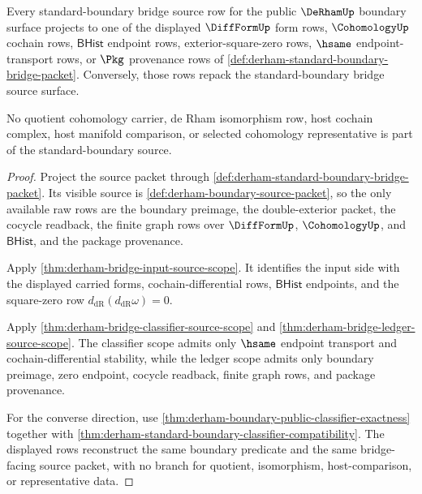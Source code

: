 \begin{theorem}
\label{thm:derham-standard-boundary-source-exhaustion}
Every standard-boundary bridge source row for the public $\DeRhamUp$ boundary
surface projects to one of the displayed $\DiffFormUp$ form rows,
$\CohomologyUp$ cochain rows, $\mathsf{BHist}$ endpoint rows,
exterior-square-zero rows, $\hsame$ endpoint-transport rows, or $\Pkg$
provenance rows of \autoref{def:derham-standard-boundary-bridge-packet}.
Conversely, those rows repack the standard-boundary bridge source surface.

No quotient cohomology carrier, de Rham isomorphism row, host cochain complex,
host manifold comparison, or selected cohomology representative is part of the
standard-boundary source.
\end{theorem}
\begin{proof}
Project the source packet through
\autoref{def:derham-standard-boundary-bridge-packet}. Its visible source is
\autoref{def:derham-boundary-source-packet}, so the only available raw rows are
the boundary preimage, the double-exterior packet, the cocycle readback, the
finite graph rows over $\DiffFormUp$, $\CohomologyUp$, and $\mathsf{BHist}$,
and the package provenance.

Apply \autoref{thm:derham-bridge-input-source-scope}. It identifies the input
side with the displayed carried forms, cochain-differential rows,
$\mathsf{BHist}$ endpoints, and the square-zero row
$d_{\mathrm{dR}}(d_{\mathrm{dR}}\omega)=0$.

Apply \autoref{thm:derham-bridge-classifier-source-scope} and
\autoref{thm:derham-bridge-ledger-source-scope}. The classifier scope admits
only $\hsame$ endpoint transport and cochain-differential stability, while the
ledger scope admits only boundary preimage, zero endpoint, cocycle readback,
finite graph rows, and package provenance.

For the converse direction, use
\autoref{thm:derham-boundary-public-classifier-exactness} together with
\autoref{thm:derham-standard-boundary-classifier-compatibility}. The displayed
rows reconstruct the same boundary predicate and the same bridge-facing source
packet, with no branch for quotient, isomorphism, host-comparison, or
representative data.
\end{proof}

